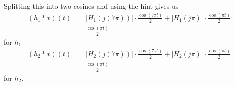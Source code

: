 \documentclass[12pt]{article}
\begin{document}
\begin{enumerate}
\begin{enumerate}
                        Splitting this into two cosines and using the hint gives us
                        \begin{align*}
                              (h_1 * x)(t)
                               & = |H_1(j(7\pi))| \cdot \frac{\cos(7\pi t)}{2}+|H_1(j\pi)| \cdot \frac{\cos(\pi t)}{2} \\
                               & = \boxed{\frac{\cos(\pi t)}{2}}
                        \end{align*}
                        for $h_1$
                        \begin{align*}
                              (h_2 * x)(t)
                               & = |H_2(j(7\pi))| \cdot \frac{\cos(7\pi t)}{2}+|H_2(j\pi)| \cdot \frac{\cos(\pi t)}{2} \\
                               & = \boxed{\frac{\cos(\pi t)}{2}}
                        \end{align*}
                        for $h_2$.


\end{enumerate}
\end{enumerate}
\end{document}
